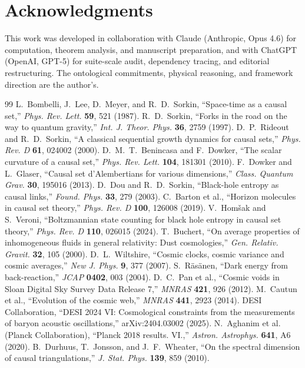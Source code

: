 \documentclass[11pt]{article}
\begin{document}
\section*{Acknowledgments}

This work was developed in collaboration with Claude (Anthropic, Opus 4.6) for computation, theorem analysis, and manuscript preparation, and with ChatGPT (OpenAI, GPT-5) for suite-scale audit, dependency tracing, and editorial restructuring. The ontological commitments, physical reasoning, and framework direction are the author's.

\begin{thebibliography}{99}
 L.~Bombelli, J.~Lee, D.~Meyer, and R.~D.~Sorkin, ``Space-time as a causal set,'' \emph{Phys. Rev. Lett.} \textbf{59}, 521 (1987).
 R.~D.~Sorkin, ``Forks in the road on the way to quantum gravity,'' \emph{Int. J. Theor. Phys.} \textbf{36}, 2759 (1997).
 D.~P.~Rideout and R.~D.~Sorkin, ``A classical sequential growth dynamics for causal sets,'' \emph{Phys. Rev. D} \textbf{61}, 024002 (2000).
 D.~M.~T.~Benincasa and F.~Dowker, ``The scalar curvature of a causal set,'' \emph{Phys. Rev. Lett.} \textbf{104}, 181301 (2010).
 F.~Dowker and L.~Glaser, ``Causal set d'Alembertians for various dimensions,'' \emph{Class. Quantum Grav.} \textbf{30}, 195016 (2013).
 D.~Dou and R.~D.~Sorkin, ``Black-hole entropy as causal links,'' \emph{Found. Phys.} \textbf{33}, 279 (2003).
 C.~Barton et al., ``Horizon molecules in causal set theory,'' \emph{Phys. Rev. D} \textbf{100}, 126008 (2019).
 V.~Hom\v{s}ak and S.~Veroni, ``Boltzmannian state counting for black hole entropy in causal set theory,'' \emph{Phys. Rev. D} \textbf{110}, 026015 (2024).
 T.~Buchert, ``On average properties of inhomogeneous fluids in general relativity: Dust cosmologies,'' \emph{Gen. Relativ. Gravit.} \textbf{32}, 105 (2000).
 D.~L.~Wiltshire, ``Cosmic clocks, cosmic variance and cosmic averages,'' \emph{New J. Phys.} \textbf{9}, 377 (2007).
 S.~R\"as\"anen, ``Dark energy from back-reaction,'' \emph{JCAP} \textbf{0402}, 003 (2004).
 D.~C.~Pan et al., ``Cosmic voids in Sloan Digital Sky Survey Data Release 7,'' \emph{MNRAS} \textbf{421}, 926 (2012).
 M.~Cautun et al., ``Evolution of the cosmic web,'' \emph{MNRAS} \textbf{441}, 2923 (2014).
 DESI Collaboration, ``DESI 2024 VI: Cosmological constraints from the measurements of baryon acoustic oscillations,'' arXiv:2404.03002 (2025).
 N.~Aghanim et al. (Planck Collaboration), ``Planck 2018 results. VI.,'' \emph{Astron. Astrophys.} \textbf{641}, A6 (2020).
 B.~Durhuus, T.~Jonsson, and J.~F.~Wheater, ``On the spectral dimension of causal triangulations,'' \emph{J. Stat. Phys.} \textbf{139}, 859 (2010).
\end{thebibliography}
\end{document}
